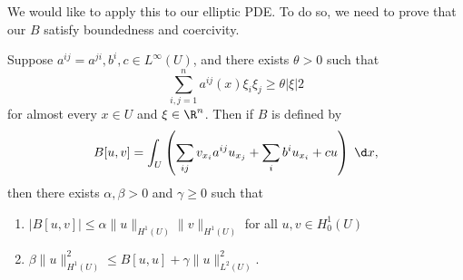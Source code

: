 \documentclass[a4paper]{article}
\begin{document}
We would like to apply this to our elliptic PDE. To do so, we need to prove that our $B$ satisfy boundedness and coercivity.

\begin{thm}
  Suppose $a^{ij} = a^{ji}, b^i, c \in L^\infty(U)$, and there exists $\theta > 0$ such that
  \[
    \sum_{i, j = 1}^n a^{ij}(x) \xi_i \xi_j \geq \theta |\xi|2
  \]
  for almost every $x \in U$ and $\xi \in \R^n$. Then if $B$ is defined by
  \[
    B[u, v] = \int_U \left(\sum_{ij} v_{x_i} a^{ij} u_{x_j} + \sum_i b^i u_{x_i} + c u\right)\;\d x,
  \]
  then there exists $\alpha, \beta > 0$ and $\gamma \geq 0$ such that
  \begin{enumerate}
    \item $|B[u, v]| \leq \alpha \|u\|_{H^1(U)} \|v\|_{H^1(U)}$ for all $u, v \in H_0^1(U)$
    \item $\beta\|u\|^2_{H^1(U)} \leq B[u, u] + \gamma \|u\|_{L^2(U)}^2$.
  \end{enumerate}
\end{thm}
\end{document}
